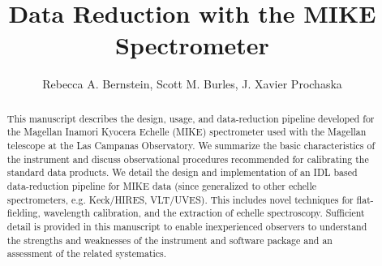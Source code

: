 \documentclass[]{emulateapj}
\begin{document}
\newcommand{\ndla}{71}
\newcommand{\kms}{km~s$^{-1}$ }
\newcommand{\cm}[1]{\, {\rm cm^{#1}}}
\newcommand{\mkms}{{\rm \; km\;s^{-1}}}
\newcommand{\delv}{\Delta v}
\newcommand{\ohi}{$\Omega_g$}
\newcommand{\lya}{Ly$\alpha$}
\newcommand{\nv}{N\,V}
\newcommand{\ovi}{O\,VI}
\newcommand{\N}[1]{{N({\rm #1})}}
\newcommand{\sci}[1]{{\rm \; \times \; 10^{#1}}}
\newcommand{\slla}{SLLS0927+5621}
\newcommand{\sllb}{SLLS0953+5230}
\newcommand{\mnhi}{N_{\rm HI}}
\newcommand{\mnciv}{N_{\rm CIV}}
\newcommand{\nhi}{$N_{\rm HI}$}
\def\fnhi{$f_{\rm{HI}} (\mnhi)$}
\def\mfnhi{f_{\rm{HI}} (\mnhi)}
\def\ltk{\left [ \,}
\def\ltp{\left ( \,}
\def\ltb{\left \{ \,}
\def\rtk{\, \right  ] }
\def\rtp{\, \right  ) }
\def\rtb{\, \right \} }
\def\nhi{$N_{\rm HI}$}
\def\lnhi{$\log N_{HI}$}
\def\omt{$\Omega_m^{Total}$}
\def\momt{\Omega_m^{Total}}

\title{Data Reduction with the MIKE Spectrometer}%

\author{
Rebecca A. Bernstein,
Scott M. Burles,
J. Xavier Prochaska}


\begin{abstract}
This manuscript describes the design, usage, and data-reduction
pipeline developed for the Magellan Inamori Kyocera Echelle (MIKE)
spectrometer used with the Magellan telescope at the Las Campanas
Observatory.  We summarize the basic characteristics of the
instrument and discuss observational procedures recommended 
for calibrating the standard data products.  We detail the design
and implementation of an IDL based data-reduction pipeline for
MIKE data (since generalized to other echelle spectrometers, e.g. 
Keck/HIRES, VLT/UVES).
This includes novel techniques for flat-fielding, wavelength calibration,
and the extraction of echelle spectroscopy.
Sufficient detail is provided in this manuscript to enable
inexperienced observers to understand the strengths and weaknesses
of the instrument and software package and an assessment of the
related systematics.

\end{abstract}

\end{document}
